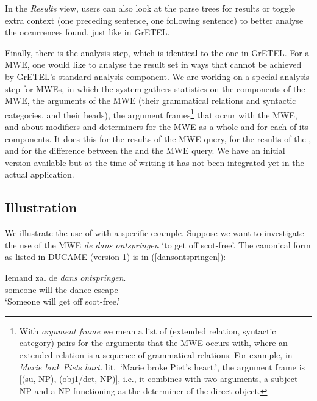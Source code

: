 \documentclass[output=paper,colorlinks,citecolor=brown]{langscibook}
\begin{document}
In the \textit{Results} view, users can also look at the parse trees for results or toggle extra context (one preceding sentence, one following sentence) to better analyse the  occurrences found, just like in GrETEL.

Finally, there is the analysis step, which is identical to the one in GrETEL.
For a MWE, one would like to analyse the result set in ways that cannot be achieved by GrETEL's standard analysis component. We are working on a special analysis step for MWEs, in which the system gathers statistics on the components of the MWE, the arguments of the MWE (their grammatical relations and syntactic categories, and their  heads), the argument frames\footnote{With \textit{argument frame} we mean a list of (extended relation, syntactic category) pairs for the arguments that the MWE occurs with, where an extended relation is a sequence of grammatical relations. For example, in \textit{Marie brak Piets hart.} lit.\ `Marie broke Piet's heart.', the argument frame is [(su, NP), (obj1/det, NP)], i.e., it combines with two arguments, a subject NP and a NP functioning as the determiner of the direct object.} that occur with the MWE, and about modifiers and determiners for the MWE as a whole and for each of its components.
It does this for the results of the MWE query, for the results of the {\nearmissquery}, and for the difference between the {\nearmissquery} and the MWE query.
We have an initial version available but at the time of writing it has not been integrated yet in the actual application.


\subsection{Illustration}
\label{example}

We illustrate the use of {\mwefinder} with a specific example. Suppose we want to investigate the use of the MWE \textit{de dans ontspringen} `to get off scot-free'. The canonical form as listed in DUCAME (version 1) is in (\ref{dansontspringen}):

\begin{exe}
    \ex \gll Iemand zal de \textit{dans} \textit{ontspringen}.\\
    someone will the dance escape\\
    \glt `Someone will get off scot-free.' \label{dansontspringen}
\end{exe}
\end{document}
